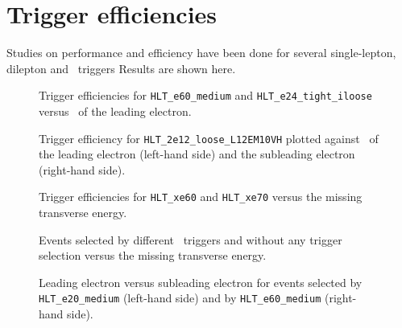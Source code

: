 \clearpage
\section{Trigger efficiencies}
\label{app_trigger}

Studies on performance and efficiency have been done for several single-lepton, dilepton and \met\ triggers Results are shown here.

\begin{figure}[h!]
\centering
{}
\caption{Trigger efficiencies for \texttt{HLT\_e60\_medium} and \texttt{HLT\_e24\_tight\_iloose} versus \pt\ of the leading electron.}
\label{fig:eff_trigger_el1}
\end{figure}

\begin{figure}[h!]
\centering
{}
\caption{Trigger efficiency for \texttt{HLT\_2e12\_loose\_L12EM10VH} plotted against \pt\ of the leading electron (left-hand side) and the subleading electron (right-hand side).}
\label{fig:eff_trigger_el2}
\end{figure}


\begin{figure}[h!]
\centering
{}
\caption{Trigger efficiencies for \texttt{HLT\_xe60} and \texttt{HLT\_xe70} versus the missing transverse energy.}
\label{fig:eff_trigger_met}
\end{figure}


\begin{figure}[h!]
\centering
{}
\caption{Events selected by different \met\ triggers and without any trigger selection versus the missing transverse energy.}
\label{fig:dummy_label}
\end{figure}

\begin{figure}[h!]
\centering
{}
\caption{Leading electron versus subleading electron for events selected by \texttt{HLT\_e20\_medium} (left-hand side) and by \texttt{HLT\_e60\_medium} (right-hand side).}
\label{fig:eff_trigger_el2D}
\end{figure}
